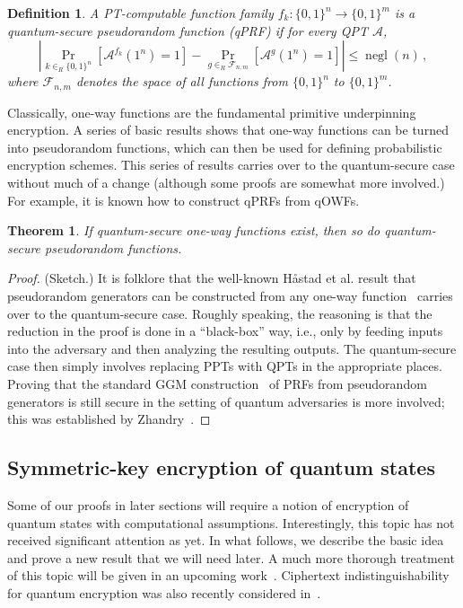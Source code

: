 \documentclass[11pt]{article}
\numberwithin{equation}{section}
\newtheorem{theorem}{Theorem}
\newtheorem{definition}{Definition}
\newcommand{\opn}{\operatorname}
\newcommand{\algo}{\mathcal}
\newcommand{\negl}{\opn{negl}}
\newcommand{\inrand}{\in_R}
\newcommand{\prob}{\opn{Pr}}
\begin{document}
\begin{definition}\label{def:quantum-secure-prf}
A PT-computable function family $f_k : \{0,1\}^n \rightarrow \{0, 1\}^m$ is a quantum-secure pseudorandom function (qPRF) if for every QPT $\algo A$, 
$$
\left|\prob_{k \inrand \{0, 1\}^n} [\algo A^{f_k}(1^n) = 1] - \prob_{g \inrand \mathcal F_{n, m}}[ \algo A^g(1^n) = 1]\right|
\leq \negl(n)\,,
$$
where $\mathcal F_{n, m}$ denotes the space of all functions from $\{0,1\}^n$ to $\{0,1\}^m$.
\end{definition}

Classically, one-way functions are the fundamental primitive underpinning encryption. A series of basic results shows that one-way functions can be turned into pseudorandom functions, which can then be used for defining probabilistic encryption schemes. This series of results carries over to the quantum-secure case without much of a change (although some proofs are somewhat more involved.) For example, it is known how to construct qPRFs from qOWFs.

\begin{theorem}\label{thm:qOWF-implies-qPRF}
If quantum-secure one-way functions exist, then so do quantum-secure pseudorandom functions.
\end{theorem}
\begin{proof} (Sketch.) It is folklore that the well-known H{\aa}stad et al. result that pseudorandom generators can be constructed from any one-way function~\cite{HILL99} carries over to the quantum-secure case. Roughly speaking, the reasoning is that the reduction in the proof is done in a ``black-box'' way, i.e., only by feeding inputs into the adversary and then analyzing the resulting outputs. The quantum-secure case then simply involves replacing PPTs with QPTs in the appropriate places. Proving that the standard GGM construction~\cite{GGM86} of PRFs from pseudorandom generators is still secure in the setting of quantum adversaries is more involved; this was established by Zhandry~\cite{Zhandry2012}.
\end{proof}

\subsection{Symmetric-key encryption of quantum states}

Some of our proofs in later sections will require a notion of encryption of quantum states with computational assumptions. Interestingly, this topic has not received significant attention as yet. In what follows, we describe the basic idea and prove a new result that we will need later. A much more thorough treatment of this topic will be given in an upcoming work~\cite{ABGFSS15}. Ciphertext indistinguishability for quantum encryption was also recently considered in~\cite{BJ15}.
\end{document}
